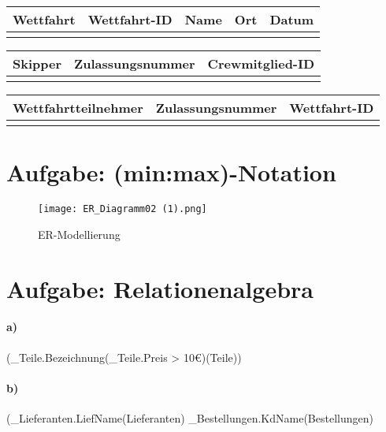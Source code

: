 \documentclass{article}
\begin{document}
\begin{table}[h!]
    \centering
    \begin{tabular}{|c|c|c|c|c|}
    \hline
         \bfseries\large{Wettfahrt} & Wettfahrt-ID & Name & Ort & Datum\\
         \hline
          & & & &  \\
    \hline
    \end{tabular}
    \label{tabelle01}
\end{table}


\begin{table}[h!]
    \centering
    \begin{tabular}{|c|c|c|}
    \hline
         \bfseries\large{Skipper} & Zulassungsnummer & Crewmitglied-ID\\
         \hline
          & & \\
    \hline
    \end{tabular}
    \label{tabelle01}
\end{table}


\begin{table}[h!]
    \centering
    \begin{tabular}{|c|c|c|}
    \hline
         \bfseries\large{Wettfahrtteilnehmer} & Zulassungsnummer & Wettfahrt-ID\\
         \hline
          & & \\
    \hline
    \end{tabular}
    \label{tabelle01}
\end{table}

\clearpage
\section{Aufgabe: (min:max)-Notation}
\begin{figure}[h]
    \centering
    \texttt{[image: ER\_Diagramm02 (1).png]}
    \caption{ER-Modellierung}
    \label{Versuch01_Aufbau01}
\end{figure}

\section{Aufgabe: Relationenalgebra}
\paragraph{a)}
(\pi_{Teile.Bezeichnung}(\sigma_{Teile.Preis > 10€})(Teile))

\paragraph{b)} (\pi_{Lieferanten.LiefName}(Lieferanten) \cup \pi_{Bestellungen.KdName}(Bestellungen)\\
\end{document}
